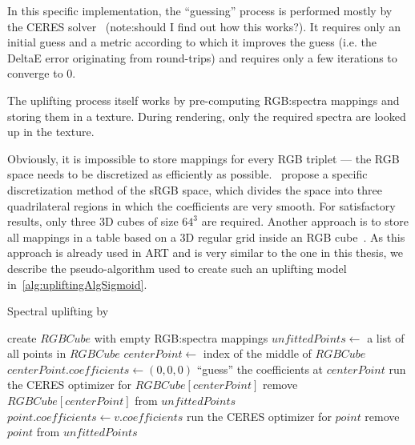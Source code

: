 In this specific implementation, the ``guessing'' process is performed mostly by the CERES solver~\cite{ceres-solver} (note:should I find out how this works?). It requires only an initial guess and a metric according to which it improves the guess (i.e. the DeltaE error originating from round-trips) and requires only a few iterations to converge to 0.

The uplifting process itself works by pre-computing RGB:spectra mappings and storing them in a texture. During rendering, only the required spectra are looked up in the texture.

Obviously, it is impossible to store mappings for every RGB triplet --- the RGB space needs to be discretized as efficiently as possible.~\citet{upsamplingJakobHanika} propose a specific discretization method of the sRGB space, which divides the space into three quadrilateral regions in which the coefficients are very smooth. For satisfactory results, only three 3D cubes of size $64^3$ are required. Another approach is to store all mappings in a table based on a 3D regular grid inside an RGB cube~\cite{upsamplingFluorescence}. As this approach is already used in ART and is very similar to the one in this thesis, we describe the pseudo-algorithm used to create such an uplifting model in~\cref{alg:upliftingAlgSigmoid}.

\begin{algorithm}[t!]
	\caption{Spectral uplifting by~\citet{upsamplingJakobHanika}}
	\label{alg:upliftingAlgSigmoid}
	\begin{algorithmic}[1]
		\State create $RGBCube$ with empty RGB:spectra mappings
		\State $unfittedPoints \gets$ a list of all points in $RGBCube$
		\State $centerPoint \gets$ index of the middle of $RGBCube$
		\Statex {}
		\State $centerPoint.coefficients \gets (0,0,0)$
		\Statex \Comment ``guess'' the coefficients at $centerPoint$
		\State run the CERES optimizer for $RGBCube[centerPoint]$
		\State remove $RGBCube[centerPoint]$ from $unfittedPoints$
		\State $point.coefficients \gets v.coefficients$
		\State run the CERES optimizer for $point$
		\State remove $point$ from $unfittedPoints$
		\EndIf
		\EndIf
		\EndFor
		\EndWhile
	\end{algorithmic}
\end{algorithm}


